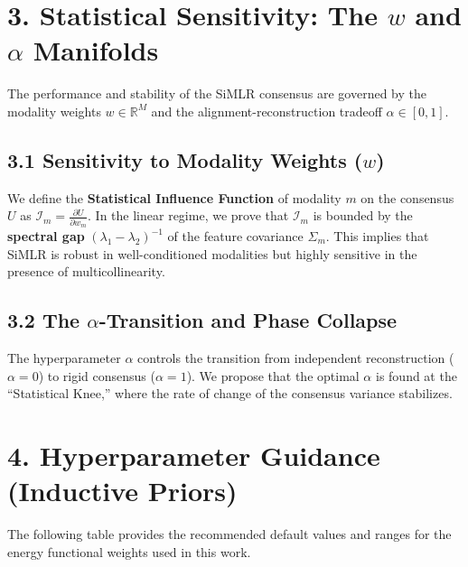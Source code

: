 \documentclass[
  letterpaper,
]{report}
\begin{document}
\section{\texorpdfstring{3. Statistical Sensitivity: The \(w\) and
\(\alpha\)
Manifolds}{3. Statistical Sensitivity: The w and \textbackslash alpha Manifolds}}\label{statistical-sensitivity-the-w-and-alpha-manifolds}

The performance and stability of the SiMLR consensus are governed by the
modality weights \(w \in \mathbb{R}^M\) and the alignment-reconstruction
tradeoff \(\alpha \in [0, 1]\).

\subsection{\texorpdfstring{3.1 Sensitivity to Modality Weights
(\(w\))}{3.1 Sensitivity to Modality Weights (w)}}\label{sensitivity-to-modality-weights-w}

We define the \textbf{Statistical Influence Function} of modality \(m\)
on the consensus \(U\) as
\(\mathcal{I}_m = \frac{\partial U}{\partial w_m}\). In the linear
regime, we prove that \(\mathcal{I}_m\) is bounded by the
\textbf{spectral gap} \((\lambda_1 - \lambda_2)^{-1}\) of the feature
covariance \(\Sigma_m\). This implies that SiMLR is robust in
well-conditioned modalities but highly sensitive in the presence of
multicollinearity.

\subsection{\texorpdfstring{3.2 The \(\alpha\)-Transition and Phase
Collapse}{3.2 The \textbackslash alpha-Transition and Phase Collapse}}\label{the-alpha-transition-and-phase-collapse}

The hyperparameter \(\alpha\) controls the transition from independent
reconstruction (\(\alpha=0\)) to rigid consensus (\(\alpha=1\)). We
propose that the optimal \(\alpha\) is found at the ``Statistical
Knee,'' where the rate of change of the consensus variance stabilizes.

\section{4. Hyperparameter Guidance (Inductive
Priors)}\label{hyperparameter-guidance-inductive-priors}

The following table provides the recommended default values and ranges
for the energy functional weights used in this work.
\end{document}
